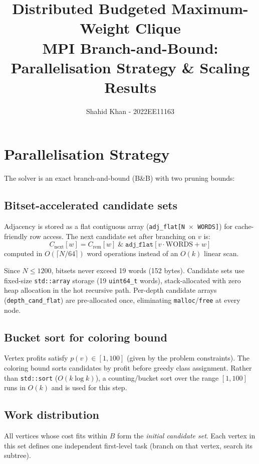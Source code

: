 \documentclass[11pt,a4paper]{article}
\title{\textbf{Distributed Budgeted Maximum-Weight Clique}\\[4pt]
       \large MPI Branch-and-Bound: Parallelisation Strategy \& Scaling Results}
\author{Shahid Khan - 2022EE11163}
\date{}
\begin{document}
\maketitle

\section*{Parallelisation Strategy}

The solver is an exact branch-and-bound (B\&B) with two pruning bounds:



\subsection*{Bitset-accelerated candidate sets}

Adjacency is stored as a flat contiguous array (\texttt{adj\_flat[N $\times$ WORDS]})
for cache-friendly row access.  The next candidate set after branching on $v$ is:
\[
  C_{\text{next}}[w] = C_{\text{rem}}[w] \;\mathbin{\&}\; \texttt{adj\_flat}[v \cdot \text{WORDS} + w]
\]
computed in $O(\lceil N/64 \rceil)$ word operations instead of an $O(k)$ linear scan.

Since $N\le1200$, bitsets never exceed 19 words (152 bytes). Candidate sets
use fixed-size \texttt{std::array} storage (19 \texttt{uint64\_t} words),
stack-allocated with zero heap allocation
in the hot recursive path.  Per-depth candidate arrays (\texttt{depth\_cand\_flat})
are pre-allocated once, eliminating \texttt{malloc}/\texttt{free} at every node.

\subsection*{Bucket sort for coloring bound}

Vertex profits satisfy $p(v)\in[1,100]$ (given by the problem constraints).
The coloring bound sorts candidates by profit before greedy class assignment.
Rather than \texttt{std::sort} ($O(k\log k)$), a counting/bucket sort over
the range $[1,100]$ runs in $O(k)$ and is used for this step.

\subsection*{Work distribution}

All vertices whose cost fits within $B$ form the \emph{initial candidate set}.
Each vertex in this set defines one independent first-level task (branch on that
vertex, search its subtree).
\end{document}
